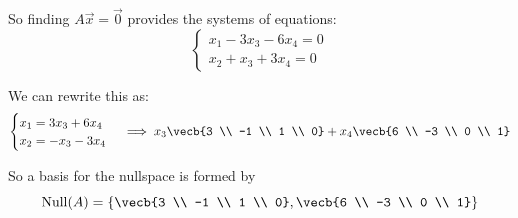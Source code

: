 So finding $A\vec{x} = \vec{0}$ provides the systems of equations:
$$\begin{cases}
x_1 - 3x_3 - 6x_4 = 0\\
x_2 + x_3 + 3x_4 = 0
\end{cases}$$

We can rewrite this as:
$$\begin{cases}
x_1 = 3x_3 + 6x_4\\
x_2 = -x_3 - 3x_4
\end{cases}
\implies
x_3 \vecb{3 \\ -1 \\ 1 \\ 0} + x_4 \vecb{6 \\ -3 \\ 0 \\ 1}
$$

So a basis for the nullspace is formed by 
$$
\operatorname{Null}(A) = \left\{
    \vecb{3 \\ -1 \\ 1 \\ 0}, \vecb{6 \\ -3 \\ 0 \\ 1}
\right\}
$$

